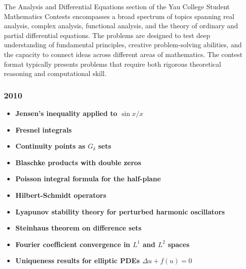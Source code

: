 The Analysis and Differential Equations section of the Yau College Student Mathematics Contests encompasses a broad spectrum of topics spanning real analysis, complex analysis, functional analysis, and the theory of ordinary and partial differential equations. The problems are designed to test deep understanding of fundamental principles, creative problem-solving abilities, and the capacity to connect ideas across different areas of mathematics. The contest format typically presents problems that require both rigorous theoretical reasoning and computational skill.

\subsubsection*{2010}
\begin{itemize}
    \item \textbf{Jensen's inequality applied to $\sin x / x$}
    \item \textbf{Fresnel integrals}
    \item \textbf{Continuity points as $G_\delta$ sets}
    \item \textbf{Blaschke products with double zeros}
    \item \textbf{Poisson integral formula for the half-plane}
    \item \textbf{Hilbert-Schmidt operators}
    \item \textbf{Lyapunov stability theory for perturbed harmonic oscillators}
    \item \textbf{Steinhaus theorem on difference sets}
    \item \textbf{Fourier coefficient convergence in $L^1$ and $L^2$ spaces}
    \item \textbf{Uniqueness results for elliptic PDEs $\Delta u + f(u) = 0$}
\end{itemize}

